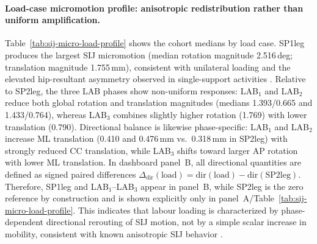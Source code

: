 \documentclass[11pt]{article}
\newcommand{\StdTableFont}{\footnotesize}
\newcommand{\StdTableInput}[1]{%
  \begingroup
  \setlength{\tabcolsep}{4pt}%
  \resizebox{\linewidth}{!}{}%
  \endgroup
}
\begin{document}
\paragraph{Load-case micromotion profile: anisotropic redistribution rather than uniform amplification.}
Table~\ref{tab:sij-micro-load-profile} shows the cohort medians by load case.
SP1leg produces the largest SIJ micromotion (median rotation magnitude 2.516\,deg; translation magnitude 1.755\,mm), consistent with unilateral loading and the elevated hip-resultant asymmetry observed in single-support activities \citep{Bergmann2001JBiomech,Kutzner2016PLOS}.
Relative to SP2leg, the three LAB phases show non-uniform responses:
LAB$_1$ and LAB$_2$ reduce both global rotation and translation magnitudes (medians 1.393/0.665 and 1.433/0.764), whereas LAB$_3$ combines slightly higher rotation (1.769) with lower translation (0.790).
Directional balance is likewise phase-specific: LAB$_1$ and LAB$_2$ increase ML translation (0.410 and 0.476\,mm vs.\ 0.318\,mm in SP2leg) with strongly reduced CC translation, while LAB$_3$ shifts toward larger AP rotation with lower ML translation.
In dashboard panel~B, all directional quantities are defined as signed paired differences
$\Delta_{\mathrm{dir}}(\text{load})=\mathrm{dir}(\text{load})-\mathrm{dir}(\mathrm{SP2leg})$.
Therefore, SP1leg and LAB$_1$--LAB$_3$ appear in panel~B, while SP2leg is the zero reference by construction and is shown explicitly only in panel~A/Table~\ref{tab:sij-micro-load-profile}.
This indicates that labour loading is characterized by phase-dependent directional rerouting of SIJ motion, not by a simple scalar increase in mobility, consistent with known anisotropic SIJ behavior \citep{Goode2008,Meijer2014,Keizer2019,Noe2020}.

\begin{table}[!tbp]
\centering
\caption{SIJ micromotion profile across static load cases (cohort medians).}
\label{tab:sij-micro-load-profile}
\StdTableFont
\StdTableInput{../../analysis_outputs/sij_micromotion/sij_micromotion_load_summary.tex}
\end{table}
\end{document}
